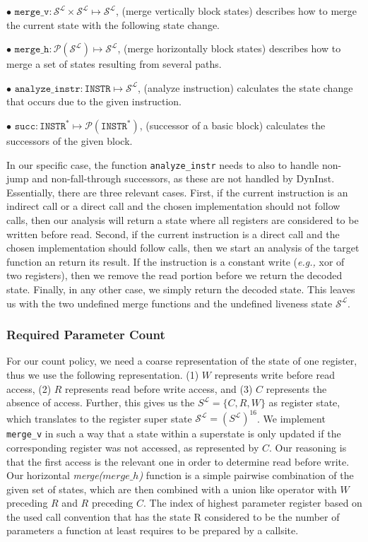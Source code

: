 $\bullet$ $\texttt{merge\_v} : \mathcal{S}^\mathcal{L} \times \mathcal{S}^\mathcal{L} \mapsto \mathcal{S}^\mathcal{L}$, (merge vertically block states) describes how to merge the current state with the following state change.

$\bullet$ $\texttt{merge\_h} : \mathcal{P}(\mathcal{S}^\mathcal{L}) \mapsto \mathcal{S}^\mathcal{L}$, (merge horizontally block states) describes how to merge a set of states resulting from several paths.

$\bullet$ $\texttt{analyze\_instr} : \texttt{INSTR} \mapsto \mathcal{S}^\mathcal{L}$, (analyze instruction) calculates the state change that occurs due to the given instruction.

$\bullet$ $\texttt{succ} : \texttt{INSTR}^* \mapsto \mathcal{P}(\texttt{INSTR}^*)$, (successor of a basic block) calculates the successors of the given block.

In our specific case, the function \texttt{analyze\_instr} needs to also to handle non-jump and non-fall-through successors, as these are not handled by DynInst. 
Essentially, there are three relevant cases.
First, if the current instruction is an indirect call or a direct call and the chosen implementation should not follow calls, 
then our analysis will return a state where all registers are considered to be written before read. Second, if the current instruction is a direct call and the chosen implementation should follow calls, 
then we start an analysis of the target function an return its result.
If the instruction is a constant write (\textit{e.g.,} xor of two registers), 
then we remove the read portion before we return the decoded state.
Finally, in any other case, we simply return the decoded state.
This leaves us with the two undefined merge functions and the undefined liveness state $\mathcal{S}^\mathcal{L}$. 

\subsubsection{Required Parameter Count} 
For our {count} policy, we need a coarse representation of the state of one register, thus we use the following representation.
(1) $W$ represents write before read access, 
(2) $R$ represents read before write access, and 
(3) $C$ represents the absence of access. 
Further, this gives us the $S^\mathcal{L} = \{ C, R, W \}$ as register state, which translates to the register super state $\mathcal{S}^\mathcal{L} = (S^\mathcal{L})^{16}$. 
We implement \texttt{merge\_v} in such a way that a state within a superstate is only updated if the corresponding register was not accessed, as represented by $C$. 
Our reasoning is that the first access is the relevant one in order to determine read before write.
Our horizontal \textit{merge($merge\_h$)} function is a simple pairwise combination of the given set of states, which are then combined with a union like operator with $W$ preceding $R$ and $R$ preceding $C$.
The index of highest parameter register based on the used call convention that has the state R considered to be the number of parameters a function at least requires to be prepared by a callsite.

